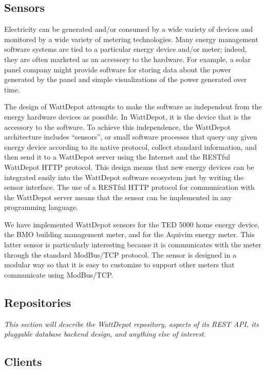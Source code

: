 \documentclass[conference,compsoc]{IEEEtran}
\begin{document}
\subsection{Sensors}

Electricity can be generated and/or consumed by a wide variety of devices
and monitored by a wide variety of metering technologies.  Many energy
management software systems are tied to a particular energy device and/or
meter; indeed, they are often marketed as an accessory to the hardware.  For
example, a solar panel company might provide software for storing data
about the power generated by the panel and simple visualizations of the
power generated over time.

The design of WattDepot attempts to make the software as independent from
the energy hardware devices as possible.  In WattDepot, it is the device
that is the accessory to the software.  To achieve this independence, the
WattDepot architecture includes ``sensors'', or small software processes
that query any given energy device according to its native protocol,
collect standard information, and then send it to a WattDepot server using
the Internet and the RESTful WattDepot HTTP protocol.  This design means
that new energy devices can be integrated easily into the WattDepot
software ecosystem just by writing the sensor interface.  The use of a
RESTful HTTP protocol for communication with the WattDepot server means
that the sensor can be implemented in any programming language.

We have implemented WattDepot sensors for the TED 5000 home energy device, 
the BMO building management meter, and for the Aquivim energy meter. This
latter sensor is particularly interesting because it is communicates with the
meter through the standard ModBus/TCP protocol.  The sensor is designed in 
a modular way so that it is easy to customize to support other meters that 
communicate using ModBus/TCP.




\subsection{Repositories}

{\em This section will describe the WattDepot repository, aspects of its
  REST API, its pluggable database backend design, and anything else of
  interest.}

\subsection{Clients}
\end{document}
